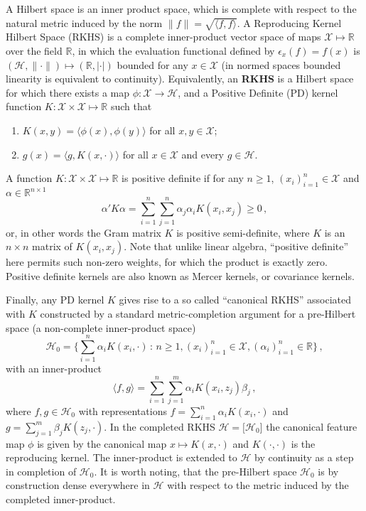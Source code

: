\documentclass[a4paper,14pt]{extarticle}
\newcommand{\Hcal}{\mathcal{H}}
\newcommand{\Xcal}{\mathcal{X}}
\newcommand{\Real}{\mathbb{R}}
\begin{document}
A Hilbert space is an inner product space, which is complete with respect to the
natural metric induced by the norm $ \|f\| = \sqrt{\langle f, f\rangle} $. A Reproducing
Kernel Hilbert Space (RKHS) is a complete inner-product vector space of maps $\Xcal
\mapsto \Real$ over the field $\Real$, in which the evaluation functional defined
by $\epsilon_x(f) = f(x)$ is $(\Hcal, \|\cdot\|) \mapsto (\Real, |\cdot|)$ bounded
for any $x\in \Xcal$ (in normed spaces bounded linearity is equivalent to continuity).
Equivalently, an \textbf{RKHS} is a Hilbert space for which there exists a map
$\phi:\Xcal\to\Hcal$, and a Positive Definite (PD) kernel function
$K:\Xcal \times \Xcal \mapsto \Real$ such that \begin{enumerate}
  \item $K(x,y) = \langle \phi(x), \phi(y) \rangle$ for all $x, y\in \Xcal$;
  \item $g(x) = \langle g, K(x, \cdot)\rangle$ for all $x\in \Xcal$ and every
  $g\in \Hcal$.
\end{enumerate}
A function $K:\Xcal \times \Xcal \mapsto \Real$ is positive definite if for any
$n\geq1$, $(x_i)_{i=1}^n \in \Xcal$ and $\alpha \in \Real^{n\times 1}$
\begin{equation*}
  \alpha'K\alpha
    = \sum_{i=1}^n \sum_{j=1}^n \alpha_j \alpha_i K(x_i, x_j)
    \geq 0
    \,,
\end{equation*}
or, in other words the Gram matrix $K$ is positive semi-definite, where $K$ is an
$n \times n$ matrix of $K(x_i, x_j)$. Note that unlike linear algebra, ``positive
definite'' here permits such non-zero weights, for which the product is exactly
zero. Positive definite kernels are also known as Mercer kernels, or covariance
kernels.

Finally, any PD kernel $K$ gives rise to a so called ``canonical RKHS'' associated
with $K$ constructed by a standard metric-completion argument for a pre-Hilbert
space (a non-complete inner-product space)
\begin{equation*}
\Hcal_0
  = \bigl\{
    \sum_{i=1}^n \alpha_i K(x_i, \cdot)
    \,:\, n\geq1, (x_i)_{i=1}^n \in \Xcal, (\alpha_i)_{i=1}^n\in \Real
  \bigr\} \,,
\end{equation*}
with an inner-product 
\begin{equation*}
  \langle f, g \rangle = \sum_{i=1}^n \sum_{j=1}^m \alpha_i K(x_i, z_j) \beta_j \,,
\end{equation*}
where $f, g\in \Hcal_0$ with representations $f = \sum_{i=1}^n \alpha_i K(x_i, \cdot)$
and $g = \sum_{j=1}^m \beta_j K(z_j, \cdot)$. In the completed RKHS $\Hcal = \bigl[\Hcal_0\bigr]$
the canonical feature map $\phi$ is given by the canonical map $x\mapsto K(x, \cdot)$
and $K(\cdot, \cdot)$ is the reproducing kernel. The inner-product is extended to
$\Hcal$ by continuity as a step in completion of $\Hcal_0$. It is worth noting, that
the pre-Hilbert space $\Hcal_0$ is by construction dense everywhere in $\Hcal$ with
respect to the metric induced by the completed inner-product.
\end{document}
